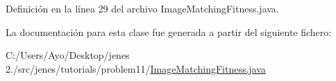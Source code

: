 Definición en la línea 29 del archivo Image\-Matching\-Fitness.\-java.



La documentación para esta clase fue generada a partir del siguiente fichero\-:\begin{DoxyCompactItemize}
\item 
C\-:/\-Users/\-Ayo/\-Desktop/jenes 2./src/jenes/tutorials/problem11/\hyperlink{_image_matching_fitness_8java}{Image\-Matching\-Fitness.\-java}\end{DoxyCompactItemize}
